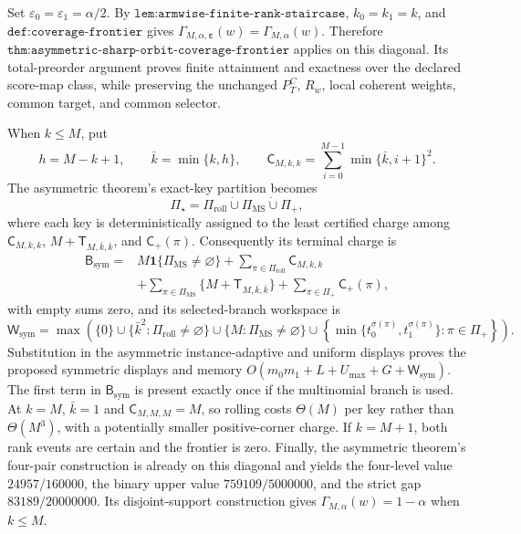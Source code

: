 Set \(\varepsilon_0=\varepsilon_1=\alpha/2\). By \(\texttt{lem:armwise-finite-rank-staircase}\), \(k_0=k_1=k\), and \(\texttt{def:coverage-frontier}\) gives \(\Gamma_{M,\alpha,\boldsymbol\varepsilon}(w)=\Gamma_{M,\alpha}(w)\). Therefore \(\texttt{thm:asymmetric-sharp-orbit-coverage-frontier}\) applies on this diagonal. Its total-preorder argument proves finite attainment and exactness over the declared score-map class, while preserving the unchanged \(P_T^C\), \(R_w\), local coherent weights, common target, and common selector.

When \(k\le M\), put
\[h=M-k+1,\qquad \bar k=\min\{k,h\},\qquad \mathsf C_{M,k,k}=\sum_{i=0}^{M-1}\min\{\bar k,i+1\}^2.\]
The asymmetric theorem's exact-key partition becomes
\[\Pi_\star=\Pi_{\mathrm{roll}}\mathbin{\dot\cup}\Pi_{\mathrm{MS}}\mathbin{\dot\cup}\Pi_+,\]
where each key is deterministically assigned to the least certified charge among \(\mathsf C_{M,k,k}\), \(M+\mathsf T_{M,\bar k,\bar k}\), and \(\mathsf C_+(\pi)\). Consequently its terminal charge is
\[\begin{aligned}\mathsf B_{\mathrm{sym}}={}&M\mathbf 1\{\Pi_{\mathrm{MS}}\ne\varnothing\}+\sum_{\pi\in\Pi_{\mathrm{roll}}}\mathsf C_{M,k,k}\\&+\sum_{\pi\in\Pi_{\mathrm{MS}}}\{M+\mathsf T_{M,\bar k,\bar k}\}+\sum_{\pi\in\Pi_+}\mathsf C_+(\pi),\end{aligned}\]
with empty sums zero, and its selected-branch workspace is
\[\mathsf W_{\mathrm{sym}}=\max\!\left(\{0\}\cup\{\bar k^2:\Pi_{\mathrm{roll}}\ne\varnothing\}\cup\{M:\Pi_{\mathrm{MS}}\ne\varnothing\}\cup\left\{\min\{t_0^{\sigma(\pi)},t_1^{\sigma(\pi)}\}:\pi\in\Pi_+\right\}\right).\]
Substitution in the asymmetric instance-adaptive and uniform displays proves the proposed symmetric displays and memory \(O(m_0m_1+L+U_{\max}+G+\mathsf W_{\mathrm{sym}})\). The first term in \(\mathsf B_{\mathrm{sym}}\) is present exactly once if the multinomial branch is used. At \(k=M\), \(\bar k=1\) and \(\mathsf C_{M,M,M}=M\), so rolling costs \(\Theta(M)\) per key rather than \(\Theta(M^3)\), with a potentially smaller positive-corner charge. If \(k=M+1\), both rank events are certain and the frontier is zero. Finally, the asymmetric theorem's four-pair construction is already on this diagonal and yields the four-level value \(24957/160000\), the binary upper value \(759109/5000000\), and the strict gap \(83189/20000000\). Its disjoint-support construction gives \(\Gamma_{M,\alpha}(w)=1-\alpha\) when \(k\le M\).
